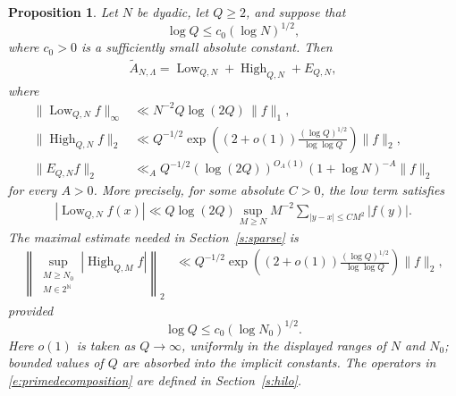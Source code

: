 \documentclass[12pt,reqno]{amsart}
\numberwithin{equation}{section}
\newtheorem{proposition}[equation]{Proposition}
\theoremstyle{definition}
\theoremstyle{remark}
\begin{document}
\begin{proposition}\label{p:decompositionofan}
Let \(N\) be dyadic, let \(Q\geq2\), and suppose that
\[
 \log Q\leq c_0(\log N)^{1/2},
\]
where \(c_0>0\) is a sufficiently small absolute constant.  Then
\begin{align}\label{e:primedecomposition}
 \widetilde A_{N,\Lambda}
 =
 \operatorname{Low}_{Q,N}
 +\operatorname{High}_{Q,N}+E_{Q,N},
\end{align}
where
\begin{align}
 \|\operatorname{Low}_{Q,N}f\|_\infty
 &\ll N^{-2}Q\log(2Q)\,\|f\|_1,
 \label{e:primelow}\\
 \|\operatorname{High}_{Q,N}f\|_2
 &\ll Q^{-1/2}
 \exp\left(
 (2+o(1))\frac{(\log Q)^{1/2}}{\log\log Q}
 \right)\|f\|_2,
 \label{e:primehigh}\\
 \|E_{Q,N}f\|_2
 &\ll_A Q^{-1/2}(\log(2Q))^{O_A(1)}
 (1+\log N)^{-A}\|f\|_2
 \label{e:primeerror}
\end{align}
for every \(A>0\).  More precisely, for some absolute \(C>0\),
the low term satisfies
\begin{align}\label{e:primelowlocal}
 |\operatorname{Low}_{Q,N}f(x)|
 \ll Q\log(2Q)\sup_{M\geq N}M^{-2}
 \sum_{|y-x|\leq CM^2}|f(y)|.
\end{align}
The maximal estimate needed in Section~\ref{s:sparse} is
\begin{align}\label{e:primehighmax}
 \left\|
 \sup_{\substack{M\geq N_0\\M\in2^{\mathbb N}}}
 |\operatorname{High}_{Q,M}f|
 \right\|_2
 &\ll Q^{-1/2}
 \exp\left(
 (2+o(1))\frac{(\log Q)^{1/2}}{\log\log Q}
 \right)\|f\|_2,
\end{align}
provided
\[
 \log Q\leq c_0(\log N_0)^{1/2}.
\]
 Here \(o(1)\) is taken as \(Q\to\infty\), uniformly in the displayed
ranges of \(N\) and \(N_0\); bounded values of \(Q\) are absorbed into
the implicit constants. 
The operators in
\eqref{e:primedecomposition} are defined in
Section~\ref{s:hilo}.
\end{proposition}
\end{document}
